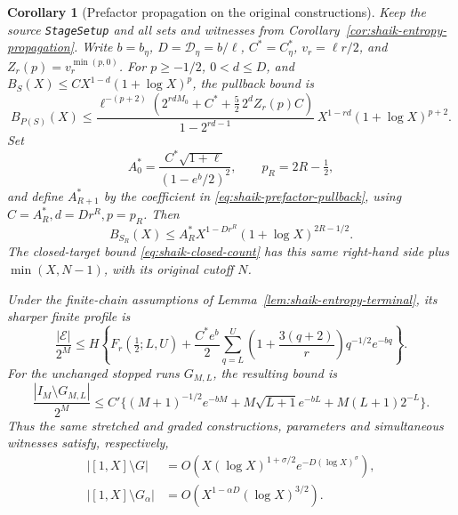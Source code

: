 \documentclass[11pt]{article}
\newtheorem{corollary}[proposition]{Corollary}
\theoremstyle{remark}\newtheorem{remark}[proposition]{Remark}
\begin{document}
\begin{corollary}[Prefactor propagation on the original constructions]
\label{cor:shaik-prefactor-propagation}
Keep the source \texttt{StageSetup} and all sets and witnesses from
Corollary~\ref{cor:shaik-entropy-propagation}.
Write \(b=b_\eta\), \(D=\mathcal D_\eta=b/\ell\),
\(C^*=C_\eta^*\), \(v_r=\ell r/2\), and
\(Z_r(p)=v_r^{\min(p,0)}\).
For \(p\ge-1/2\), \(0<d\le D\), and
\(B_S(X)\le C X^{1-d}(1+\log X)^p\), the pullback bound is
\begin{equation}\label{eq:shaik-prefactor-pullback}
 B_{P(S)}(X)\le
 \frac{\ell^{-(p+2)}
  (2^{rdM_0}+C^*+\frac52\,2^d Z_r(p)C)}
 {1-2^{rd-1}}\,
 X^{1-rd}(1+\log X)^{p+2}.
\end{equation}
Set
\[
 A_0^*=\frac{C^*\sqrt{1+\ell}}{(1-e^b/2)^2},\qquad
 p_R=2R-\tfrac12,
\]
and define \(A_{R+1}^*\) by the coefficient in
\eqref{eq:shaik-prefactor-pullback}, using
\(C=A_R^*,d=Dr^R,p=p_R\). Then
\begin{equation}\label{eq:shaik-prefactor-iterate}
 B_{S_R}(X)\le A_R^*X^{1-Dr^R}(1+\log X)^{2R-1/2}.
\end{equation}
The closed-target bound \eqref{eq:shaik-closed-count} has this same
right-hand side plus \(\min(X,N-1)\), with its original cutoff \(N\).

Under the finite-chain assumptions of
Lemma~\ref{lem:shaik-entropy-terminal}, its sharper finite profile is
\begin{equation}\label{eq:shaik-prefactor-terminal}
 \frac{|\mathcal E|}{2^M}\le H\left\{F_r(\tfrac12;L,U)
 +\frac{C^*e^b}{2}
   \sum_{q=L}^U\left(1+\frac{3(q+2)}r\right)q^{-1/2}e^{-bq}\right\}.
\end{equation}
For the unchanged stopped runs \(G_{M,L}\), the resulting bound is
\begin{equation}\label{eq:shaik-prefactor-fixed-failure}
 \frac{|I_M\setminus G_{M,L}|}{2^M}
 \le C'\{(M+1)^{-1/2}e^{-bM}
       +M\sqrt{L+1}e^{-bL}+M(L+1)2^{-L}\}.
\end{equation}
Thus the same stretched and graded constructions, parameters and
simultaneous witnesses satisfy, respectively,
\begin{align}
 |[1,X]\setminus G|
 &=O\!\left(X(\log X)^{1+\sigma/2}
                    e^{-D(\log X)^\sigma}\right),
 \label{eq:shaik-prefactor-stretched}\\
 |[1,X]\setminus G_\alpha|
 &=O\!\left(X^{1-\alpha D}(\log X)^{3/2}\right).
 \label{eq:shaik-prefactor-graded}
\end{align}
\end{corollary}
\end{document}
